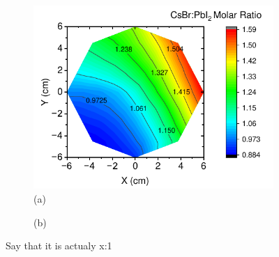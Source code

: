 \begin{figure}[htbp]
    \centering
    \begin{subfigure}[t]{0.6\textwidth}
        \centering
        \includegraphics[width=\textwidth]{chapters/stability/imeges/Molar_Ratio.pdf} %
        \caption*{(a)}
    \end{subfigure}
    \begin{subfigure}[t]{0.25\textwidth}
        \centering
        \caption*{(b)}
    \end{subfigure}

\caption{Say that it is actualy x:1}
\label{fig:stability:ellipsometry:molar_ratio}

\end{figure}


